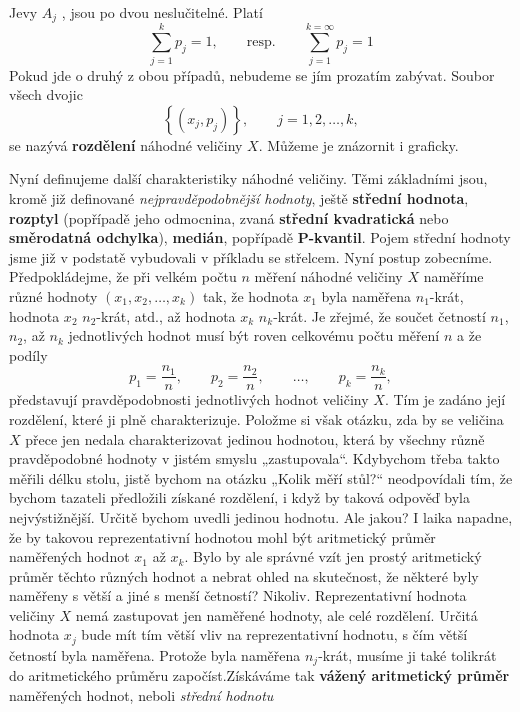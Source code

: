     Jevy \(A_j\) , jsou po dvou neslučitelné. Platí
    \begin{equation*}
      \sum_{j=1}^{k}p_j = 1, \qquad\text{resp.}\qquad \sum_{j=1}^{k=\infty}p_j = 1
    \end{equation*}
    Pokud jde o druhý z obou případů, nebudeme se jím prozatím zabývat. Soubor všech dvojic
    \begin{equation*}
      \left\lbrace(x_j, p_j)\right\rbrace,\qquad j = 1, 2, \ldots, k,
    \end{equation*}
    se nazývá \textbf{rozdělení} náhodné veličiny \(X\). Můžeme je znázornit i graficky.

    
    
    Nyní definujeme další charakteristiky náhodné veličiny. Těmi základními jsou, kromě již 
    definované \emph{nejpravděpodobnější hodnoty}, ještě \textbf{střední hodnota}, \textbf{rozptyl} 
    (popřípadě jeho odmocnina, zvaná \textbf{střední kvadratická} nebo \textbf{směrodatná 
    odchylka}), \textbf{medián}, popřípadě \textbf{P-kvantil}. Pojem střední hodnoty jsme již v 
    podstatě vybudovali v příkladu se střelcem. Nyní postup zobecníme. Předpokládejme, že při 
    velkém počtu \(n\) měření náhodné veličiny \(X\) naměříme různé hodnoty \((x_1, x_2, \ldots, 
    x_k)\) tak, že hodnota \(x_1\) byla naměřena \(n_1\)-krát, hodnota \(x_2\) \(n_2\)-krát, atd., 
    až hodnota \(x_k\) \(n_k\)-krát. Je zřejmé, že součet četností \(n_1\), \(n_2\), až \(n_k\) 
    jednotlivých hodnot musí být roven celkovému počtu měření \(n\) a že podíly
    \begin{equation*}
      p_1 = \dfrac{n_1}{n}, \qquad p_2 = \dfrac{n_2}{n}, \qquad \ldots, \qquad p_k = \dfrac{n_k}{n},
    \end{equation*}
    představují pravděpodobnosti jednotlivých hodnot veličiny \(X\). Tím je zadáno její rozdělení,
    které ji plně charakterizuje. Položme si však otázku, zda by se veličina \(X\) přece jen nedala
    charakterizovat jedinou hodnotou, která by všechny různě pravděpodobné hodnoty v jistém
    smyslu „zastupovala“. Kdybychom třeba takto měřili délku stolu, jistě bychom na otázku „Kolik
    měří stůl?“ neodpovídali tím, že bychom tazateli předložili získané rozdělení, i když by taková
    odpověď byla nejvýstižnější. Určitě bychom uvedli jedinou hodnotu. Ale jakou? I laika napadne,
    že by takovou reprezentativní hodnotou mohl být aritmetický průměr naměřených hodnot \(x_1\) až
    \(x_k\). Bylo by ale správné vzít jen prostý aritmetický průměr těchto různých hodnot a nebrat 
    ohled na skutečnost, že některé byly naměřeny s větší a jiné s menší četností? Nikoliv. 
    Reprezentativní hodnota veličiny \(X\) nemá zastupovat jen naměřené hodnoty, ale celé 
    rozdělení. Určitá hodnota \(x_j\) bude mít tím větší vliv na reprezentativní hodnotu, s čím 
    větší četností byla naměřena. Protože byla naměřena \(n_j\)-krát, musíme ji také tolikrát do 
    aritmetického průměru započíst.Získáváme tak \textbf{vážený aritmetický průměr} naměřených 
    hodnot, neboli \emph{střední hodnotu}
    
